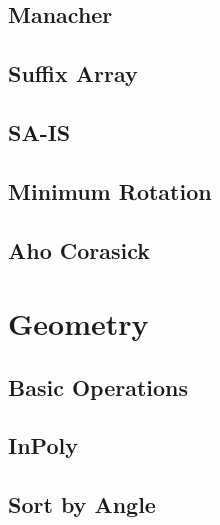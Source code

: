 \documentclass[a4paper,10pt,twocolumn,oneside]{article}
\begin{document}
\subsection{Manacher}


% 

\subsection{Suffix Array}


\subsection{SA-IS}


\subsection{Minimum Rotation}


\subsection{Aho Corasick}







\section{Geometry}

\subsection{Basic Operations}


\subsection{InPoly}


\subsection{Sort by Angle}

\end{document}
